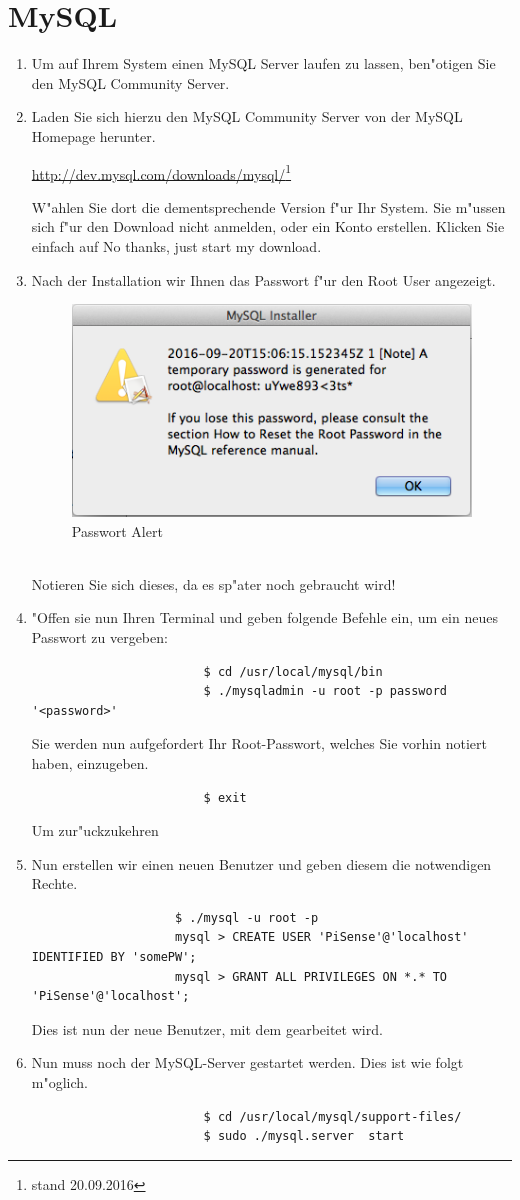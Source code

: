 \documentclass[oneside, a4paper, 11pt]{report}
\begin{document}
		\section{MySQL}
			\begin{enumerate}
				\item[] 
					Um auf Ihrem System einen MySQL Server laufen zu lassen, ben"otigen Sie den \glqq{}MySQL Community Server\grqq{}.
				\item 
					Laden Sie sich hierzu den MySQL Community Server von der MySQL Homepage herunter.
						\begin{center}
							\url{http://dev.mysql.com/downloads/mysql/}\footnote{stand 20.09.2016}
						\end{center}
					W"ahlen Sie dort die dementsprechende Version f"ur Ihr System. Sie m"ussen sich f"ur den Download nicht anmelden, oder ein Konto erstellen. Klicken Sie einfach auf \glqq{}No thanks, just start my download\grqq{}. 
				\item
					Nach der Installation wir Ihnen das Passwort f"ur den Root User angezeigt.
					\begin{figure}[h!]
						\centering
						\includegraphics[width=0.4\linewidth]{img/rootPW.png}
						\caption{Passwort Alert \label{pw_alrt}}
					\end{figure}\\
					Notieren Sie sich dieses, da es sp"ater noch gebraucht wird!
				\item 
					"Offen sie nun Ihren Terminal und geben folgende Befehle ein, um ein neues Passwort zu vergeben:
					\begin{verbatim}
						$ cd /usr/local/mysql/bin
						$ ./mysqladmin -u root -p password '<password>'
					\end{verbatim}
					Sie werden nun aufgefordert Ihr Root-Passwort, welches Sie vorhin notiert haben, einzugeben.
					\begin{verbatim}
						$ exit
					\end{verbatim}
					Um zur"uckzukehren
				\newpage
				\item
					Nun erstellen wir einen neuen Benutzer und geben diesem die notwendigen Rechte.
					\begin{verbatim}
					$ ./mysql -u root -p
					mysql > CREATE USER 'PiSense'@'localhost' IDENTIFIED BY 'somePW';
					mysql > GRANT ALL PRIVILEGES ON *.* TO 'PiSense'@'localhost';
					\end{verbatim}
					Dies ist nun der neue Benutzer, mit dem gearbeitet wird.
				\item
					Nun muss noch der MySQL-Server gestartet werden. Dies ist wie folgt m"oglich.
					\begin{verbatim}
						$ cd /usr/local/mysql/support-files/
						$ sudo ./mysql.server  start
					\end{verbatim}
			\end{enumerate}
\end{document}
